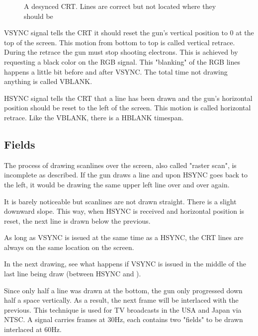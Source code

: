 \begin{figure}[H]
\caption*{A desynced CRT. Lines are correct but not located where they should be}
\end{figure}





VSYNC signal tells the CRT it should reset the gun's vertical position to 0 at the top of the screen. This motion from bottom to top is called vertical retrace. During the retrace the gun must stop shooting electrons. This is achieved by requesting a black color on the RGB signal. This "blanking" of the RGB lines happens a little bit before and after VSYNC. The total time not drawing anything is called VBLANK.

HSYNC signal tells the CRT that a line has been drawn and the gun's horizontal position should be reset to the left of the screen. This motion is called horizontal retrace. Like the VBLANK, there is a HBLANK timespan. 

\pagebreak
\subsection{Fields}

The process of drawing scanlines over the screen, also called "raster scan", is incomplete as described. If the gun draws a line and upon HSYNC goes back to the left, it would be drawing the same upper left line over and over again. 

It is barely noticeable but scanlines are not drawn straight. There is a slight downward slope. This way, when HSYNC is received and horizontal position is reset, the next line is drawn below the previous.




As long as VSYNC is issued at the same time as a HSYNC, the CRT lines are always on the same location on the screen.

In the next drawing, see what happens if VSYNC  is issued in the middle of the last line being draw (between HSYNC  and ).


Since only half a line was drawn at the bottom, the gun only progressed down half a space vertically. As a result, the next frame will be interlaced with the previous. This technique is used for TV broadcasts in the USA and Japan via NTSC. A signal carries frames at 30Hz, each contains two "fields" to be drawn interlaced at 60Hz.

